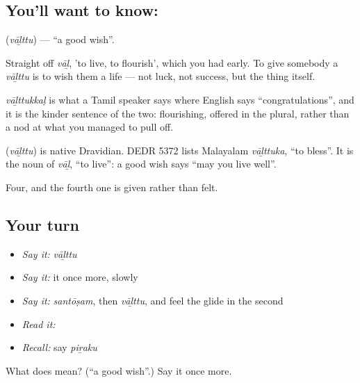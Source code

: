\subsection*{You'll want to know: }
\textbf{} (\emph{vāḻttu}) — \textquotedblleft{}a good wish\textquotedblright{}.

Straight off \emph{vāḻ}, 'to live, to flourish', which you had early. To give somebody a \emph{vāḻttu} is to wish them a life — not luck, not success, but the thing itself.

\emph{vāḻttukkaḷ} is what a Tamil speaker says where English says \textquotedblleft{}congratulations\textquotedblright{}, and it is the kinder sentence of the two: flourishing, offered in the plural, rather than a nod at what you managed to pull off.

\begin{cousinweb}
\textbf{} (\emph{vāḻttu}) is native Dravidian. DEDR 5372 lists Malayalam \emph{vāḻttuka}, \textquotedblleft{}to bless\textquotedblright{}. It is the noun of \emph{vāḻ}, \textquotedblleft{}to live\textquotedblright{}: a good wish says \textquotedblleft{}may you live well\textquotedblright{}.
\end{cousinweb}

\begin{grammarlens}[title={What you've built}]
Four, and the fourth one is given rather than felt.
\end{grammarlens}

\subsection*{Your turn}
\begin{itemize}
\raggedright
  \item \emph{Say it:} \emph{vāḻttu}
  \item \emph{Say it:} it once more, slowly
  \item \emph{Say it:} \emph{santōṣam}, then \emph{vāḻttu}, and feel the  glide in the second
  \item \emph{Read it:} \textbf{}
  \item \emph{Recall:} say \emph{piṟaku}
\end{itemize}

\begin{tcolorbox}[breakable,colback=teal!4,colframe=teal!35!black,title={Before you move on}]
What does  mean? (\textquotedblleft{}a good wish\textquotedblright{}.) Say it once more.
\end{tcolorbox}
